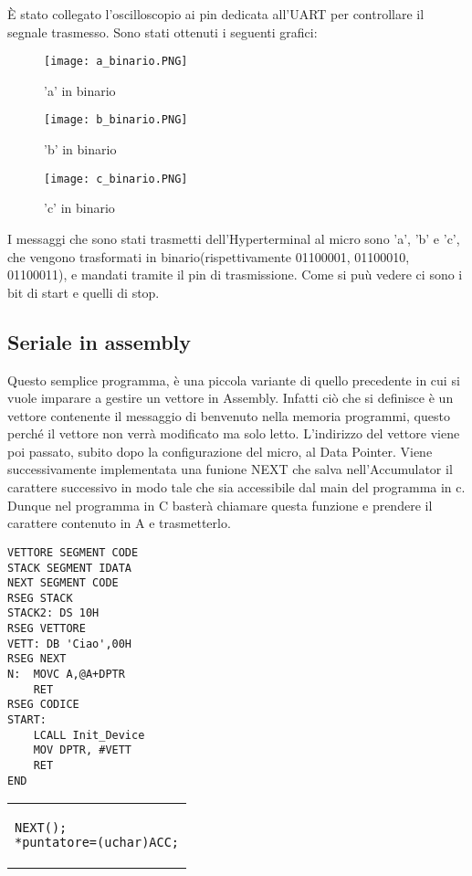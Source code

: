 \documentclass[main.tex]{subfiles}
\begin{document}
È stato collegato l'oscilloscopio ai pin dedicata all'UART per controllare il segnale trasmesso. Sono stati ottenuti i seguenti grafici:
\begin{figure}[H]
    \centering
    \texttt{[image: a\_binario.PNG]}
    \caption{'a' in binario}
    \label{fig:a}
\end{figure}
\begin{figure}[H]
    \centering
    \texttt{[image: b\_binario.PNG]}
    \caption{'b' in binario}
    \label{fig:b}
\end{figure}
\begin{figure}[H]
    \centering
    \texttt{[image: c\_binario.PNG]}
    \caption{'c' in binario}
    \label{fig:c}
\end{figure}
I messaggi che sono stati trasmetti dell'Hyperterminal al micro sono 'a', 'b' e 'c', che vengono trasformati in binario(rispettivamente 01100001, 01100010, 01100011), e mandati tramite il pin di trasmissione. Come si puù vedere ci sono i bit di start e quelli di stop.

\subsection{Seriale in assembly}

Questo semplice programma, è una piccola variante di quello precedente in cui si vuole imparare a gestire un vettore in Assembly. Infatti ciò che si definisce è un vettore contenente il messaggio di benvenuto nella memoria programmi, questo perché il vettore non verrà modificato ma solo letto. L'indirizzo del vettore viene poi passato, subito dopo la configurazione del micro, al Data Pointer. Viene successivamente implementata una funione NEXT che salva nell'Accumulator il carattere successivo in modo tale che sia accessibile dal main del programma in c. Dunque nel programma in C basterà chiamare questa funzione e prendere il carattere contenuto in A e trasmetterlo. 


\begin{minipage}{0.41\textwidth}
\begin{lstlisting}[caption=Vettore in Assembly]
VETTORE SEGMENT CODE
STACK SEGMENT IDATA
NEXT SEGMENT CODE
RSEG STACK
STACK2: DS 10H
RSEG VETTORE
VETT: DB 'Ciao',00H
RSEG NEXT
N:	MOVC A,@A+DPTR
    RET
RSEG CODICE
START:
	LCALL Init_Device
	MOV DPTR, #VETT
	RET
END
\end{lstlisting}
\end{minipage}%
\hfill
\begin{minipage}{0.49\textwidth}
\begin{tabular}{|p{}}
\begin{lstlisting}[caption=codice in C]
NEXT();
*puntatore=(uchar)ACC;
\end{lstlisting}
\end{tabular}
\end{minipage}%
\end{document}

